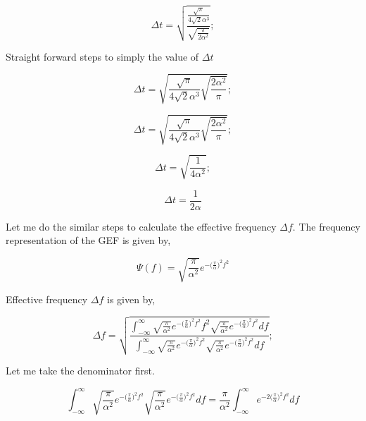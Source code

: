 \documentclass[paper=a4, fontsize=11pt,twoside]{scrartcl}		%
\begin{document}
\begin{equation*}
\Delta t = \sqrt{\frac{\frac{\sqrt{\pi}}{4 \sqrt{2}\alpha ^3}}{\sqrt{\frac{\pi}{2\alpha ^ 2}}}} ;
\end{equation*}

Straight forward steps to simply the value of $\Delta t$

\begin{equation*}
\Delta t =  \sqrt{\frac{\sqrt{\pi}}{4 \sqrt{2}\alpha ^3}{\sqrt{\frac{2\alpha ^ 2}{\pi}}}} ;
\end{equation*}

\begin{equation*}
\Delta t =  \sqrt{\frac{\sqrt{\pi}}{4 \sqrt{2}\alpha ^3}{\sqrt{\frac{2\alpha ^ 2}{\pi}}}} ;
\end{equation*}

\begin{equation*}
\Delta t =  \sqrt{\frac{1}{4 \alpha ^2}};
\end{equation*}


\begin{equation}
\Delta t =  \frac{1}{2 \alpha }
\end{equation}

Let me do the similar steps to calculate the effective frequency $\Delta f$. The frequency representation of the GEF is given by,

\begin{equation*}
\Psi(f) = \sqrt{\frac{\pi}{\alpha ^2}} e^{-{(\frac{\pi} {\alpha}})^2 f^2}
\end{equation*}

Effective frequency $\Delta f$ is given by,

\begin{equation*}
\Delta f = \sqrt{\frac{\int_{-\infty}^{\infty}{\sqrt{\frac{\pi}{\alpha ^2}} e^{-{(\frac{\pi} {\alpha}})^2 f^2} f^2 \sqrt{\frac{\pi}{\alpha ^2}} e^{-{(\frac{\pi} {\alpha}})^2 f^2} df}}{\int_{-\infty}^{\infty}{\sqrt{\frac{\pi}{\alpha ^2}} e^{-{(\frac{\pi} {\alpha}})^2 f^2}  \sqrt{\frac{\pi}{\alpha ^2}} e^{-{(\frac{\pi} {\alpha}})^2 f^2} df}}} ;
\end{equation*}

Let me take the denominator first.


\begin{equation*}
\int_{-\infty}^{\infty}{\sqrt{\frac{\pi}{\alpha ^2}} e^{-{(\frac{\pi} {\alpha}})^2 f^2}  \sqrt{\frac{\pi}{\alpha ^2}} e^{-{(\frac{\pi} {\alpha}})^2 f^2} df} = \frac{\pi}{\alpha ^2} \int_{-\infty}^{\infty}{ e^{-2{(\frac{\pi} {\alpha}})^2 f^2}df}
\end{equation*}
\end{document}
